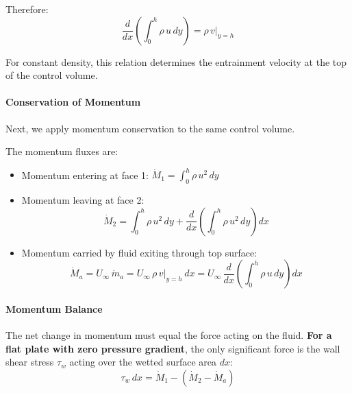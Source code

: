 Therefore:
\[
\frac{d}{dx}\left(\int_0^h \rho\,u\,dy\right) = \rho\,v\big|_{y=h}
\]

For constant density, this relation determines the entrainment velocity at the top of the control volume.

\paragraph{Conservation of Momentum}
Next, we apply momentum conservation to the same control volume.

The momentum fluxes are:
\begin{itemize}
    \item Momentum entering at face 1: $\dot{M}_1 = \int_0^h \rho\,u^2\,dy$
    
    \item Momentum leaving at face 2: 
    \[
    \dot{M}_2 = \int_0^h \rho\,u^2\,dy + \frac{d}{dx}\left(\int_0^h \rho\,u^2\,dy\right)dx
    \]
    
    \item Momentum carried by fluid exiting through top surface:
    \[
    \dot{M}_a = U_\infty\,\dot{m}_a = U_\infty\,\rho\,v\big|_{y=h}\,dx = U_\infty\,\frac{d}{dx}\left(\int_0^h \rho\,u\,dy\right)dx
    \]
\end{itemize}

\paragraph{Momentum Balance}
The net change in momentum must equal the force acting on the fluid. \textbf{For a flat plate with zero pressure gradient}, the only significant force is the wall shear stress $\tau_w$ acting over the wetted surface area $dx$:
\[
\tau_w\,dx = \dot{M}_1 - (\dot{M}_2 - \dot{M}_a)
\]

